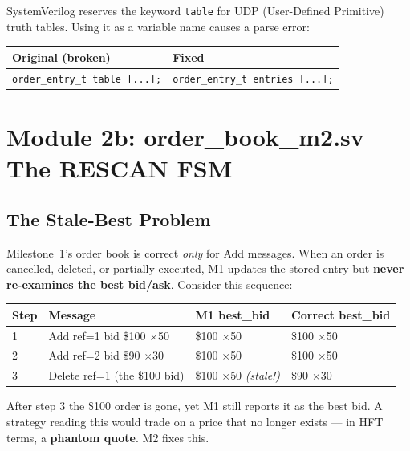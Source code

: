 \documentclass[11pt,a4paper]{article}
\begin{document}
SystemVerilog reserves the keyword \texttt{table} for UDP (User-Defined
Primitive) truth tables. Using it as a variable name causes a parse error:

\begin{center}
\small
\begin{tabular}{l l}
\toprule
\textbf{Original (broken)} & \textbf{Fixed} \\
\midrule
\texttt{order\_entry\_t table [...];} & \texttt{order\_entry\_t entries [...];} \\
\bottomrule
\end{tabular}
\end{center}

\section{Module 2b: order\_book\_m2.sv --- The RESCAN FSM}
\label{sec:m2book}

\subsection{The Stale-Best Problem}

Milestone~1's order book is correct \emph{only} for Add messages. When an order
is cancelled, deleted, or partially executed, M1 updates the stored entry but
\textbf{never re-examines the best bid/ask}. Consider this sequence:

\begin{center}
\small
\begin{tabular}{l l l l}
\toprule
\textbf{Step} & \textbf{Message} & \textbf{M1 best\_bid} & \textbf{Correct best\_bid} \\
\midrule
1 & Add ref=1 bid \$100 $\times$50 & \$100 $\times$50 & \$100 $\times$50 \\
2 & Add ref=2 bid \$90 $\times$30  & \$100 $\times$50 & \$100 $\times$50 \\
\rowcolor{bugred!18}
3 & Delete ref=1 (the \$100 bid)   & \$100 $\times$50 \textit{(stale!)} & \$90 $\times$30 \\
\bottomrule
\end{tabular}
\end{center}

\noindent After step 3 the \$100 order is gone, yet M1 still reports it as the
best bid. A strategy reading this would trade on a price that no longer exists ---
in HFT terms, a \textbf{phantom quote}. M2 fixes this.
\end{document}
